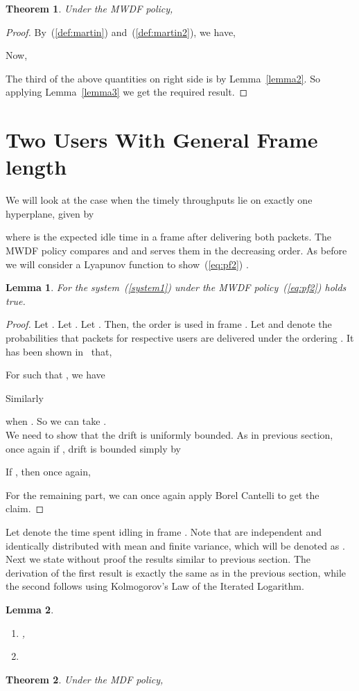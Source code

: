 \documentclass[letterpaper, 10 pt, conference]{ieeeconf}
\newtheorem{lemma}{Lemma}
\newtheorem{theorem}{Theorem}
\begin{document}
\begin{theorem}\label{theorem:main}
Under the MWDF policy, 

\end{theorem}

\begin{proof} By~(\ref{def:martin}) and~(\ref{def:martin2}), we have,

Now,


The third of the above quantities on right side is  by Lemma~\ref{lemma2}. So applying Lemma~\ref{lemma3} we get the required result. 
\end{proof}


 \section{Two Users With General Frame length}\label{sec4}
We will look at the case when the timely throughputs lie on exactly one hyperplane, given by

where  is the expected idle time in a frame after delivering both packets.
The MWDF policy compares  and  and serves them in the decreasing order. As before we will consider a Lyapunov function to show~(\ref{eq:pf2}) .
\begin{lemma}\label{lemma8}
For the system~(\ref{system1}) under the MWDF policy~(\ref{eq:pf2}) holds true.
\end{lemma}
\begin{proof} Let . Let . Let . Then, the order  is used in frame . Let  and  denote the probabilities that packets for respective users are delivered under the ordering . It has been shown in~\cite{c3} that, 
 
For  such that , we have

Similarly 

 when . 
So we can take .\\ 
We need to show that the drift is uniformly bounded. As in previous section, once again if , drift is bounded simply by 

If , then once again,

For the remaining part, we can once again apply Borel Cantelli to get the claim.
\end{proof}
Let  denote the time spent idling in frame . Note that  are independent and identically distributed with mean  and finite variance, which will be denoted as . Next we state without proof the results similar to previous section. The derivation of the first result is exactly the same as in the previous section, while the second follows using Kolmogorov's Law of the Iterated Logarithm.
\begin{lemma}
\begin{enumerate}
\item 
,
\item 

\end{enumerate}

\end{lemma} 
\begin{theorem}\label{theorem:main1}
Under the MDF policy, 

\end{theorem}
\end{document}
